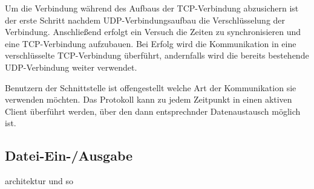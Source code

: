Um die Verbindung während des Aufbaus der TCP-Verbindung abzusichern ist der erste Schritt nachdem UDP-Verbindungsaufbau die Verschlüsselung der Verbindung. Anschließend erfolgt ein Versuch die Zeiten zu synchronisieren und eine TCP-Verbindung aufzubauen. Bei Erfolg wird die Kommunikation in eine verschlüsselte TCP-Verbindung überführt, andernfalls wird die bereits bestehende UDP-Verbindung weiter verwendet.

Benutzern der Schnittstelle ist offengestellt welche Art der Kommunikation sie verwenden möchten. Das Protokoll kann zu jedem Zeitpunkt in einen aktiven Client überführt werden, über den dann entsprechnder Datenaustausch möglich ist.

\subsection{Datei-Ein-/Ausgabe}
architektur und so
